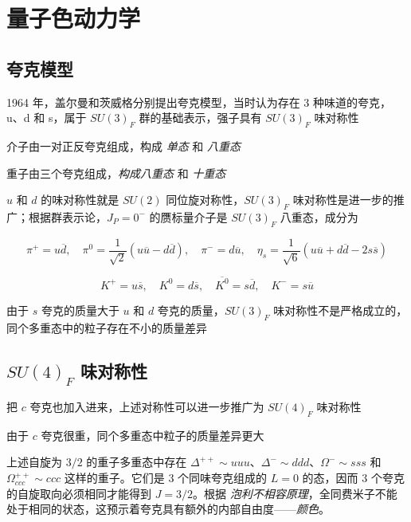 \section{量子色动力学}

\subsection{夸克模型}

1964 年，盖尔曼和茨威格分别提出夸克模型，当时认为存在 3 种味道的夸克，u、d 和 s，属于 $SU(3)_F$ 群的基础表示，强子具有 $SU(3)_F$ 味对称性

介子由一对正反夸克组成，构成 \emph{单态} 和 \emph{八重态}

重子由三个夸克组成，\emph{构成八重态} 和 \emph{十重态}

$u$ 和 $d$ 的味对称性就是 $SU(2)$ 同位旋对称性，$SU(3)_F$ 味对称性是进一步的推广；根据群表示论，$J_P = 0^-$ 的赝标量介子是 $SU(3)_F$ 八重态，成分为

\begin{equation}
    \pi^+ = u\overline{d}, \quad \pi^0 = \frac{1}{\sqrt{2}} (u\overline{u}-d\overline{d}), \quad \pi^- = d\overline{u}, \quad \eta_s = \frac{1}{\sqrt{6}} (u\overline{u}+d\overline{d}-2s\overline{s})
\end{equation}

\begin{equation}
    K^+ = u\overline{s}, \quad K^0 = d\overline{s}, \quad \overline{K^0} = s\overline{d}, \quad K^- = s\overline{u}
\end{equation}

由于 $s$ 夸克的质量大于 $u$ 和 $d$ 夸克的质量，$SU(3)_F$ 味对称性不是严格成立的，同个多重态中的粒子存在不小的质量差异

\subsection{\texorpdfstring{$SU(4)_F$}{SU(4)F} 味对称性}

把 $c$ 夸克也加入进来，上述对称性可以进一步推广为 $SU(4)_F$ 味对称性

由于 $c$ 夸克很重，同个多重态中粒子的质量差异更大

上述自旋为 $3/2$ 的重子多重态中存在 $\Delta^{++} \sim uuu$、$\Delta^- \sim ddd$、$\Omega^- \sim sss$ 和 $\Omega^{++}_{ccc} \sim ccc$ 这样的重子。它们是 $3$ 个同味夸克组成的 $L=0$ 的态，因而 $3$ 个夸克的自旋取向必须相同才能得到 $J=3/2$。根据 \emph{泡利不相容原理}，全同费米子不能处于相同的状态，这预示着夸克具有额外的内部自由度——\emph{颜色}。

